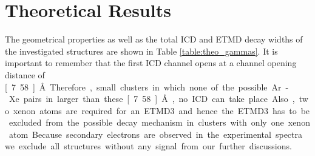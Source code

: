 \section{Theoretical Results}

The geometrical properties as well as the total ICD and ETMD decay widths
of the investigated structures are shown in Table \ref{table:theo_gammas}.
It is important to remember that the first ICD channel opens at a
channel opening distance of \unit[7.58]{\AA}. Therefore, small
clusters in which none of the possible Ar-Xe pairs in larger than
these \unit[7.58]{\AA}, no ICD can take place. Also, two xenon atoms are
required for an ETMD3 and hence the ETMD3 has to be excluded from
the possible decay mechanism in clusters with only one xenon atom.
Because secondary electrons are observed in the experimental spectra
we exclude all structures without any signal from our further
discussions.

